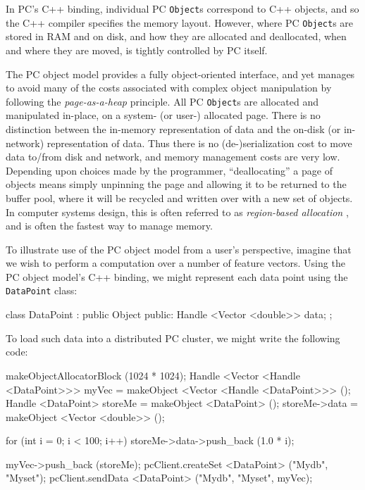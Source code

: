 In PC's C++ binding, individual PC \texttt{Object}s correspond to C++ objects, and so the C++ compiler specifies the memory layout.
However, where PC \texttt{Object}s are stored in RAM and on disk, and how they are allocated and deallocated, when and where they are moved, is
tightly controlled by PC itself.

The PC object model provides a fully object-oriented interface, and yet manages to avoid many of the costs associated with complex object manipulation
by following the \emph{page-as-a-heap} principle.  
All PC \texttt{Object}s are allocated and manipulated in-place, on a system-
(or user-) allocated page.  There is
no distinction between the in-memory representation of data and the on-disk (or in-network) representation of
data. Thus there is no (de-)serialization cost to move data to/from disk and network, and memory management costs are very low. Depending upon choices made by the
programmer, ``deallocating'' a page of objects
means simply unpinning the page and allowing it to be returned to the buffer
pool, where it will be recycled and written over with a new set of objects.  
In computer systems design, this is often referred to as
\emph{region-based allocation} \cite{tofte1997region,
  grossman2002region}, and is often the fastest way to manage
memory. 

To illustrate use of the PC object model from a user's perspective,
imagine that we wish to perform a computation over a number of feature vectors.  
Using the PC object model's C++ binding, we might represent each data point using the 
\texttt{DataPoint} class:

\begin{codesmall}
class DataPoint : public Object {
public:
	Handle <Vector <double>> data;
};
\end{codesmall}

\noindent
To load such data into a distributed PC cluster, we might write the following code:

\begin{codesmall}
makeObjectAllocatorBlock (1024 * 1024);
Handle <Vector <Handle <DataPoint>>> myVec = 
     makeObject <Vector <Handle <DataPoint>>> ();
Handle <DataPoint> storeMe = makeObject <DataPoint> ();
storeMe->data = makeObject <Vector <double>> ();

for (int i = 0; i < 100; i++) 
     storeMe->data->push_back (1.0 * i);

myVec->push_back (storeMe);
pcClient.createSet <DataPoint> ("Mydb", "Myset");
pcClient.sendData <DataPoint> ("Mydb", "Myset", myVec);
\end{codesmall}

